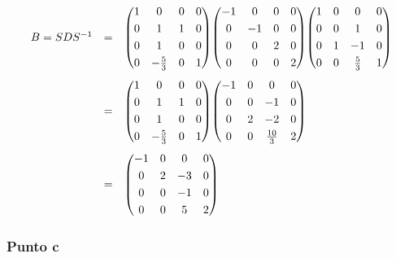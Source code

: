 \documentclass[a4paper]{article}
\makeatletter
\newenvironment{rowequmat}[1]{\left(\array{@{}#1@{}}}{\endarray\right)}
\makeatother
\begin{document}
	\begin{equation*}
		\begin{array}{lll}
			B = SDS^{-1} &=&
			\begin{rowequmat}{cccc}
				1 & 0				& 0 & 0 \\ [.3em]
				0 & 1				& 1 & 0 \\ [.3em]
				0 & 1				& 0 & 0 \\ [.3em]
				0 & -\frac{5}{3}	& 0 & 1
			\end{rowequmat}
			\begin{rowequmat}{cccc}
				-1 & 0 & 0 & 0 \\ [.3em]
				0 & -1 & 0 & 0 \\ [.3em]
				0 & 0 & 2 & 0 \\ [.3em]
				0 & 0 & 0 & 2 
			\end{rowequmat}
			\begin{rowequmat}{cccc}
				1 & 0 & 0 & 0 \\ [.3em]
				0 & 0 & 1 & 0 \\ [.3em]
				0 & 1 & -1 & 0 \\ [.3em]
				0 & 0 & \frac{5}{3} & 1
			\end{rowequmat} \\[3em]
			&=&
			\begin{rowequmat}{cccc}
				1 & 0				& 0 & 0 \\ [.3em]
				0 & 1				& 1 & 0 \\ [.3em]
				0 & 1				& 0 & 0 \\ [.3em]
				0 & -\frac{5}{3}	& 0 & 1
			\end{rowequmat}
			\begin{rowequmat}{cccc}
				-1 & 0 & 0 & 0 \\ [.3em]
				0 & 0 & -1 & 0 \\ [.3em]
				0 & 2 & -2 & 0 \\ [.3em]
				0 & 0 & \frac{10}{3} & 2
			\end{rowequmat} \\[3em]
			&=&
			\begin{rowequmat}{cccc}
				-1 & 0 & 0 & 0 \\ [.3em]
				0 & 2 & -3 & 0 \\ [.3em]
				0 & 0 & -1 & 0 \\ [.3em]
				0 & 0 & 5 & 2
			\end{rowequmat}
		\end{array}
	\end{equation*}\newpage

	\subsubsection{Punto c}
\end{document}
